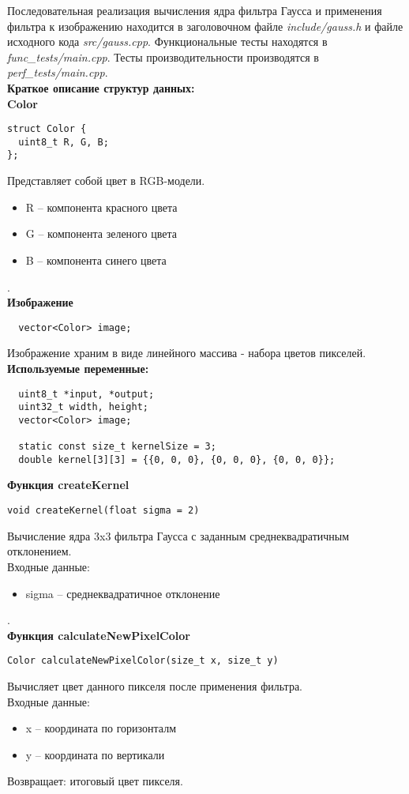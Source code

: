 \documentclass{article}
\begin{document}
\par
Последовательная реализация вычисления ядра фильтра Гаусса и применения фильтра к изображению находится в заголовочном файле \emph{include/gauss.h} и файле исходного кода \emph{src/gauss.cpp}. Функциональные тесты находятся в \emph{func\_tests/main.cpp}. Тесты производительности производятся в \emph{perf\_tests/main.cpp}.
\\
\textbf{Краткое описание структур данных:}
\\
\textbf{Color}
\begin{lstlisting}
struct Color {
  uint8_t R, G, B;
};
\end{lstlisting}
Представляет собой цвет в RGB-модели.
\\
\begin{itemize}
    \item R -- компонента красного цвета
    \item G -- компонента зеленого цвета
    \item B -- компонента синего цвета
\end{itemize}.
\\
\textbf{Изображение}
\begin{lstlisting}
  vector<Color> image;
\end{lstlisting}
Изображение храним в виде линейного массива - набора цветов пикселей.
\\
\textbf{Используемые переменные:}
\\
\begin{lstlisting}
  uint8_t *input, *output;
  uint32_t width, height;
  vector<Color> image;

  static const size_t kernelSize = 3;
  double kernel[3][3] = {{0, 0, 0}, {0, 0, 0}, {0, 0, 0}};
\end{lstlisting}
\textbf{Функция createKernel}
\begin{lstlisting}
void createKernel(float sigma = 2)
\end{lstlisting}
Вычисление ядра 3x3 фильтра Гаусса с заданным среднеквадратичным отклонением.
\\Входные данные:
\begin{itemize}
    \item sigma -- среднеквадратичное отклонение
\end{itemize}.
\\
\textbf{Функция calculateNewPixelColor} 
\begin{lstlisting}
Color calculateNewPixelColor(size_t x, size_t y)
\end{lstlisting}
Вычисляет цвет данного пикселя после применения фильтра.
\\Входные данные:
\begin{itemize}
    \item x -- координата по горизонталм
    \item y -- координата по вертикали
\end{itemize}
Возвращает: итоговый цвет пикселя.
\end{document}
